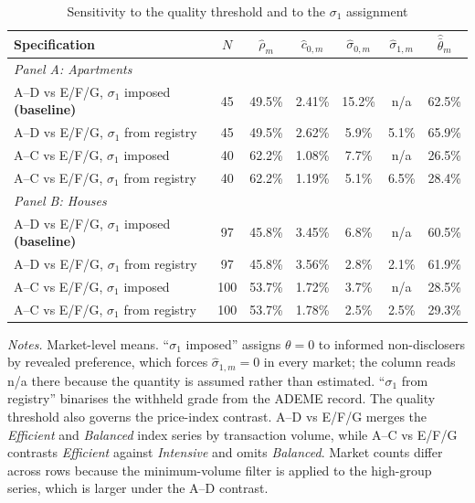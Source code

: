 \begin{table}[htbp]
\centering
\caption{Sensitivity to the quality threshold and to the $\sigma_1$ assignment}
\label{tab:robustness}
\small\renewcommand{\arraystretch}{1.25}
\begin{tabular*}{\textwidth}{@{\extracolsep{\fill}}l*{6}{c}@{}}
\toprule\toprule
\textbf{Specification} & $N$ & $\hat\rho_m$ & $\hat c_{0,m}$ & $\hat\sigma_{0,m}$ & $\hat\sigma_{1,m}$ & $\hat{\bar\theta}_m$ \\
\midrule
\multicolumn{7}{l}{\textit{Panel A: Apartments}} \\[2pt]
A--D vs E/F/G, $\sigma_1$ imposed \textbf{(baseline)} & 45 & 49.5\% & 2.41\% & 15.2\% & n/a & 62.5\% \\
A--D vs E/F/G, $\sigma_1$ from registry               & 45 & 49.5\% & 2.62\% &  5.9\% & 5.1\% & 65.9\% \\
A--C vs E/F/G, $\sigma_1$ imposed                     & 40 & 62.2\% & 1.08\% &  7.7\% & n/a & 26.5\% \\
A--C vs E/F/G, $\sigma_1$ from registry               & 40 & 62.2\% & 1.19\% &  5.1\% & 6.5\% & 28.4\% \\
\midrule
\multicolumn{7}{l}{\textit{Panel B: Houses}} \\[2pt]
A--D vs E/F/G, $\sigma_1$ imposed \textbf{(baseline)} & 97 & 45.8\% & 3.45\% &  6.8\% & n/a & 60.5\% \\
A--D vs E/F/G, $\sigma_1$ from registry               & 97 & 45.8\% & 3.56\% &  2.8\% & 2.1\% & 61.9\% \\
A--C vs E/F/G, $\sigma_1$ imposed                     & 100 & 53.7\% & 1.72\% &  3.7\% & n/a & 28.5\% \\
A--C vs E/F/G, $\sigma_1$ from registry               & 100 & 53.7\% & 1.78\% &  2.5\% & 2.5\% & 29.3\% \\
\bottomrule\bottomrule
\end{tabular*}
\vspace{0.5em}
\begin{minipage}{\linewidth}
\footnotesize\textit{Notes.} Market-level means. ``$\sigma_1$ imposed'' assigns $\theta=0$ to
informed non-disclosers by revealed preference, which forces $\hat\sigma_{1,m}=0$ in every
market; the column reads n/a there because the quantity is assumed rather than estimated.
``$\sigma_1$ from registry'' binarises the withheld grade from the ADEME record. The quality
threshold also governs the price-index contrast. A--D vs E/F/G merges the \emph{Efficient} and
\emph{Balanced} index series by transaction volume, while A--C vs E/F/G contrasts
\emph{Efficient} against \emph{Intensive} and omits \emph{Balanced}. Market counts differ
across rows because the minimum-volume filter is applied to the high-group series, which is
larger under the A--D contrast.
\end{minipage}
\end{table}


